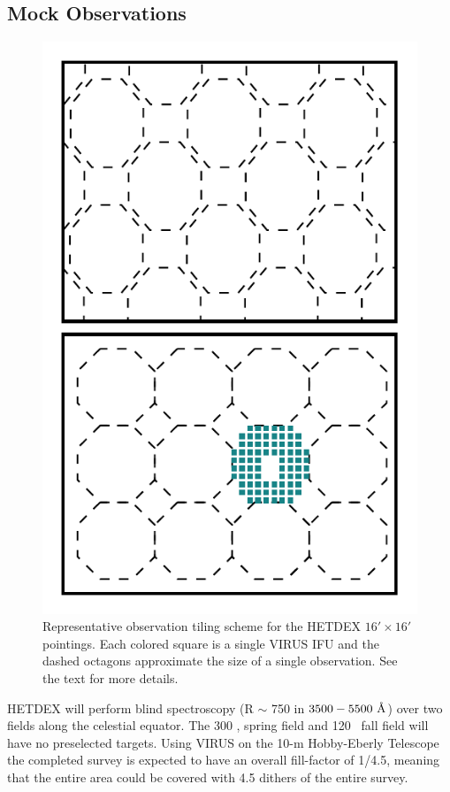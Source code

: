 \documentclass[fleqn,usenatbib]{mnras}
\begin{document}
\subsection{Mock Observations}\label{sec: observations}
\begin{figure} 
	\includegraphics[width=\columnwidth]{figures/pointings.pdf} 
	\caption{Representative observation tiling scheme for the HETDEX $16' \times 16'$ pointings. Each colored square is a single VIRUS IFU and the dashed octagons approximate the size of a single observation. See the text for more details.} \label{fig: ifu layout} 
\end{figure}

HETDEX will perform blind spectroscopy (R $\sim$ 750 in $3500 - 5500~\hbox{\AA}$) over two fields along the celestial equator. The 300 \degsq, spring field and 120 \degsq\ fall field will have no preselected targets. Using VIRUS on the 10-m Hobby-Eberly Telescope \citep{Ramsey1998} the completed survey is expected to have an overall fill-factor of 1/4.5, meaning that the entire area could be covered with 4.5 dithers of the entire survey. 
\end{document}
